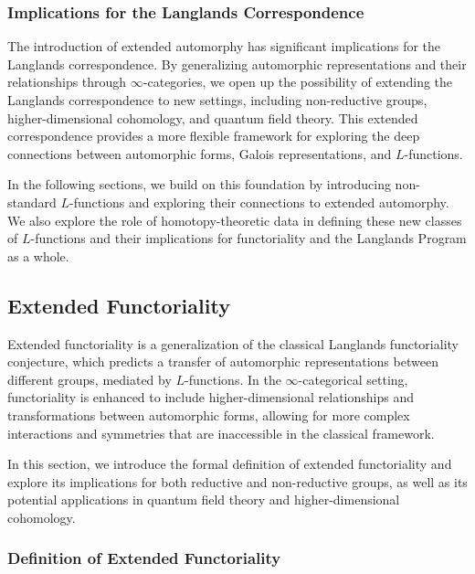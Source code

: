 \documentclass{article}
\theoremstyle{remark}
\begin{document}
\subsubsection{Implications for the Langlands Correspondence}

The introduction of extended automorphy has significant implications for the Langlands correspondence. By generalizing automorphic representations and their relationships through $\infty$-categories, we open up the possibility of extending the Langlands correspondence to new settings, including non-reductive groups, higher-dimensional cohomology, and quantum field theory. This extended correspondence provides a more flexible framework for exploring the deep connections between automorphic forms, Galois representations, and $L$-functions.

In the following sections, we build on this foundation by introducing non-standard $L$-functions and exploring their connections to extended automorphy. We also explore the role of homotopy-theoretic data in defining these new classes of $L$-functions and their implications for functoriality and the Langlands Program as a whole.

\subsection{Extended Functoriality}

Extended functoriality is a generalization of the classical Langlands functoriality conjecture, which predicts a transfer of automorphic representations between different groups, mediated by $L$-functions. In the $\infty$-categorical setting, functoriality is enhanced to include higher-dimensional relationships and transformations between automorphic forms, allowing for more complex interactions and symmetries that are inaccessible in the classical framework.

In this section, we introduce the formal definition of extended functoriality and explore its implications for both reductive and non-reductive groups, as well as its potential applications in quantum field theory and higher-dimensional cohomology.

\subsubsection{Definition of Extended Functoriality}
\end{document}
